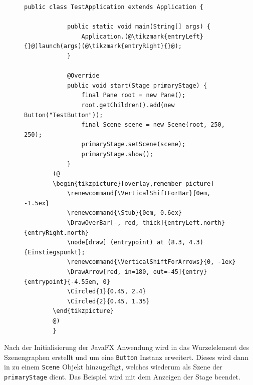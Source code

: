 \begin{figure}[H]
	\begin{lstlisting}[caption={Beispiel -- Minimale JavaFX-Anwendung}, captionpos=b, label=lst:example_javafxapp]
		public class TestApplication extends Application {
			
			public static void main(String[] args) {
				Application.(@\tikzmark{entryLeft}{}@)launch(args)(@\tikzmark{entryRight}{}@);
			}
			
			@Override
			public void start(Stage primaryStage) {
				final Pane root = new Pane();
				root.getChildren().add(new Button("TestButton"));
				final Scene scene = new Scene(root, 250, 250);
				primaryStage.setScene(scene);
				primaryStage.show();
			}
		(@
		\begin{tikzpicture}[overlay,remember picture]
			\renewcommand{\VerticalShiftForBar}{0em, -1.5ex}
			\renewcommand{\Stub}{0em, 0.6ex}
			\DrawOverBar[-, red, thick]{entryLeft.north}{entryRight.north}
			\node[draw] (entrypoint) at (8.3, 4.3) {Einstiegspunkt};
			\renewcommand{\VerticalShiftForArrows}{0, -1ex}
			\DrawArrow[red, in=180, out=-45]{entry}{entrypoint}{-4.55em, 0}
			\Circled{1}{0.45, 2.4}
			\Circled{2}{0.45, 1.35}
		\end{tikzpicture}
		@)
		}
	\end{lstlisting}
\end{figure}
\noindent Nach der Initialisierung der JavaFX Anwendung wird in  das Wurzelelement des Szenengraphen erstellt und um eine \texttt{Button} Instanz erweitert. Dieses wird dann in  zu einem \texttt{Scene} Objekt hinzugefügt, welches wiederum als Szene der \texttt{primaryStage} dient. Das Beispiel wird mit dem Anzeigen der Stage beendet.
